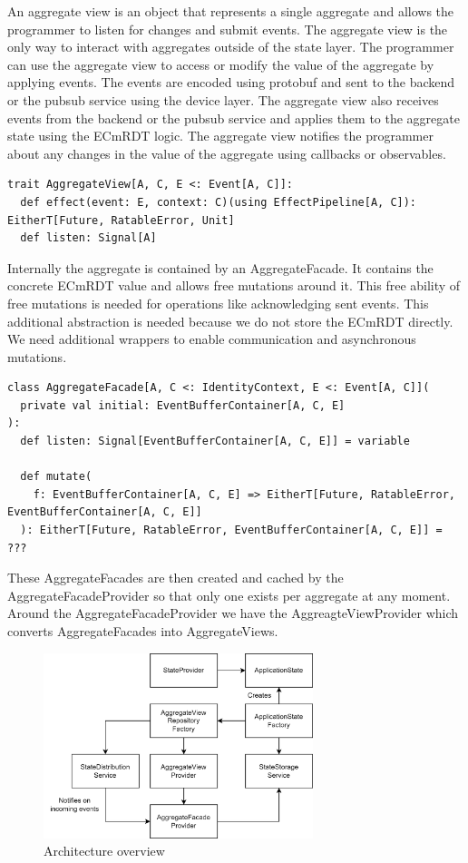 \documentclass[
	ngerman,
	ruledheaders=section,   %
	class=report,		    %
	thesis={type=bachelor}, %
	accentcolor=9c,			%
	custommargins=true,    %
	marginpar=false,        %
	parskip=half-,          %
	fontsize=11pt,          %
]{tudapub}
\begin{document}
An aggregate view is an object that represents a single aggregate and allows the programmer to listen for changes and submit events. The aggregate view is the only way to interact with aggregates outside of the state layer. The programmer can use the aggregate view to access or modify the value of the aggregate by applying events. The events are encoded using protobuf and sent to the backend or the pubsub service using the device layer. The aggregate view also receives events from the backend or the pubsub service and applies them to the aggregate state using the ECmRDT logic. The aggregate view notifies the programmer about any changes in the value of the aggregate using callbacks or observables.

\begin{lstlisting}
trait AggregateView[A, C, E <: Event[A, C]]:
  def effect(event: E, context: C)(using EffectPipeline[A, C]): EitherT[Future, RatableError, Unit]
  def listen: Signal[A]
\end{lstlisting}

Internally the aggregate is contained by an AggregateFacade. It contains the concrete ECmRDT value and allows free mutations around it. This free ability of free mutations is needed for operations like acknowledging sent events. This additional abstraction is needed because we do not store the ECmRDT directly. We need additional wrappers to enable communication and asynchronous mutations. 

\begin{lstlisting}
class AggregateFacade[A, C <: IdentityContext, E <: Event[A, C]](
  private val initial: EventBufferContainer[A, C, E]
):
  def listen: Signal[EventBufferContainer[A, C, E]] = variable

  def mutate(
    f: EventBufferContainer[A, C, E] => EitherT[Future, RatableError, EventBufferContainer[A, C, E]]
  ): EitherT[Future, RatableError, EventBufferContainer[A, C, E]] = ???

\end{lstlisting}

These AggregateFacades are then created and cached by the AggregateFacadeProvider so that only one exists per aggregate at any moment. Around the AggregateFacadeProvider we have the AggreagteViewProvider which converts AggregateFacades into AggregateViews. 

\begin{figure}[h]
  \centering
  \includegraphics[width=0.7\textwidth]{state.png}
  \caption{Architecture overview}
\end{figure}
\end{document}
